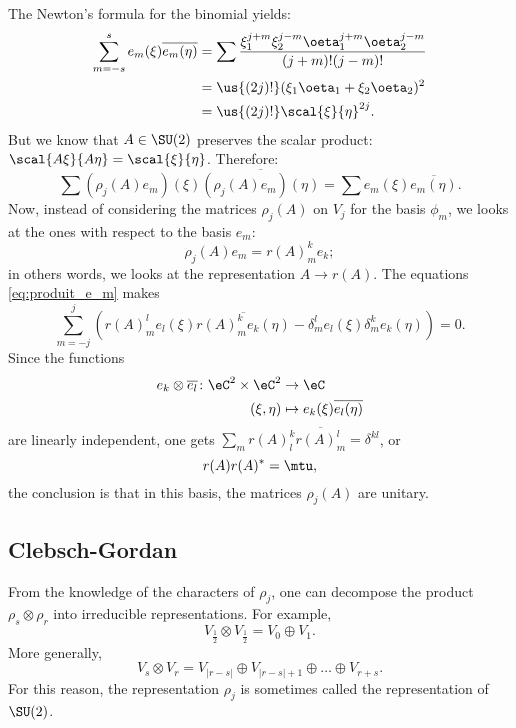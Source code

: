 The Newton's formula for the binomial yields:
\begin{equation}
\begin{split}
  \sum_{m=-s}^s e_m(\xi)\overline{e_m(\eta)}
        &=\sum\frac{ \xi_1^{j+m}\xi_2^{j-m}\oeta_1^{j+m}\oeta_2^{j-m} }{(j+m)!(j-m)!}\\
	&=\us{(2j)!}(\xi_1\oeta_1+\xi_2\oeta_2)^2\\
	&=\us{(2j)!}\scal{\xi}{\eta}^{2j}.
\end{split}
\end{equation}
But we know that $A\in\SU(2)$ preserves the scalar product: $\scal{A\xi}{A\eta}=\scal{\xi}{\eta}$. Therefore:
\begin{equation}\label{eq:produit_e_m}
\sum (\rho_j(A)e_m)(\xi)\overline{ (\rho_j(A)e_m)(\eta) }=\sum e_m(\xi)\overline{e_m(\eta)}.
\end{equation}
Now, instead of considering the matrices $\rho_j(A)$ on $V_j$ for the basis $\phi_m$, we looks at the ones with respect to the basis $e_m$:
\begin{equation}
\rho_j(A)e_m=r(A)^k_me_k;
\end{equation}
in others words, we looks at the representation $A\to r(A)$. The equations \eqref{eq:produit_e_m} makes
\[
  \sum_{m=-j}^j\left(
                      r(A)^l_me_l(\xi)\overline{ r(A)^k_me_k(\eta)   }
		        -\delta^l_me_l(\xi)\delta^k_me_k(\eta)
                \right)=0.
\]
Since the functions
\begin{equation}
\begin{aligned}
 e_k\otimes\overline{e_l}\colon \eC^2\times\eC^2 &\to \eC \\
(\xi,\eta) &\mapsto  e_k(\xi)\overline{e_l(\eta)}
\end{aligned}
\end{equation}
 are linearly independent, one gets $\sum_m r(A)^k_l\overline{r(A)^l_m}=\delta^{kl}$, or
\begin{equation}
r(A)r(A)^*=\mtu,
\end{equation}
the conclusion is that in this basis, the matrices $\rho_j(A)$ are unitary.

\subsection{Clebsch-Gordan}

From the knowledge of the characters of $\rho_j$, one can decompose the product $\rho_s\otimes\rho_r$ into irreducible representations. For example,
\[
   V_{\frac{1}{2}}\otimes V_{\frac{1}{2}}=V_0\oplus V_1.
\]
More generally,
\begin{equation}
  V_s\otimes V_r=V_{|r-s|} \oplus V_{|r-s|+1}\oplus\ldots\oplus V_{r+s}.
\end{equation}
For this reason, the representation $\rho_j$ is sometimes called the  representation of $\SU(2)$.

